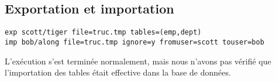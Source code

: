 \subsection{Exportation et importation}

\begin{verbatim}
exp scott/tiger file=truc.tmp tables=(emp,dept)
imp bob/along file=truc.tmp ignore=y fromuser=scott touser=bob
\end{verbatim}

L’exécution s’est terminée normalement, mais nous n’avons pas vérifié que
l’importation des tables était effective dans la base de données.
